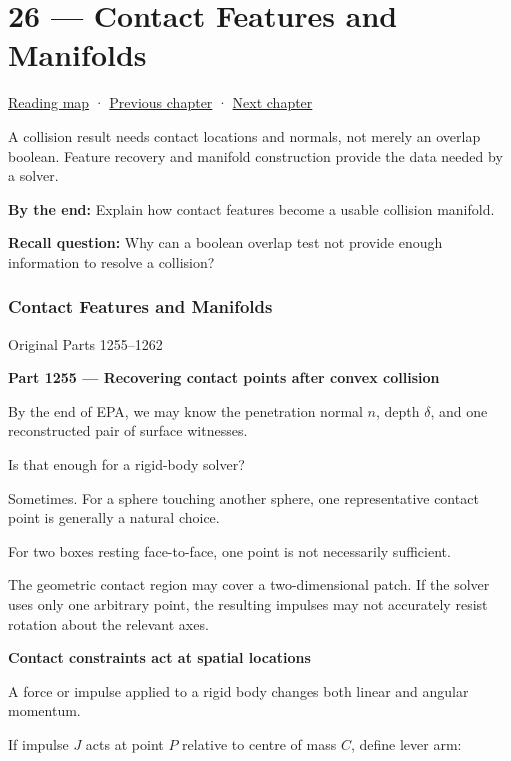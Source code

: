 \hypertarget{04-visual-computing-ii-ch026}{}
\chapter{26 --- Contact Features and Manifolds}\label{04-visual-computing-ii-ch026-contact-features-and-manifolds}

\hyperref[volume-reading-map]{Reading map} · \hyperref[04-visual-computing-ii-ch025]{Previous chapter} · \hyperref[04-visual-computing-ii-ch027]{Next chapter}

A collision result needs contact locations and normals, not merely an overlap boolean. Feature recovery and manifold construction provide the data needed by a solver.

\textbf{By the end:} Explain how contact features become a usable collision manifold.

\textbf{Recall question:} Why can a boolean overlap test not provide enough information to resolve a collision?

\subsection{Contact Features and Manifolds}\label{04-visual-computing-ii-ch026-contact-features-and-manifolds-1}

Original Parts 1255--1262

\textbf{Part 1255 --- Recovering contact points after convex collision}

By the end of EPA, we may know the penetration normal \(n\), depth \(\delta\), and one reconstructed pair of surface witnesses.

Is that enough for a rigid-body solver?

Sometimes. For a sphere touching another sphere, one representative contact point is generally a natural choice.

For two boxes resting face-to-face, one point is not necessarily sufficient.

The geometric contact region may cover a two-dimensional patch. If the solver uses only one arbitrary point, the resulting impulses may not accurately resist rotation about the relevant axes.

\textbf{Contact constraints act at spatial locations}

A force or impulse applied to a rigid body changes both linear and angular momentum.

If impulse \(J\) acts at point \(P\) relative to centre of mass \(C\), define lever arm:


